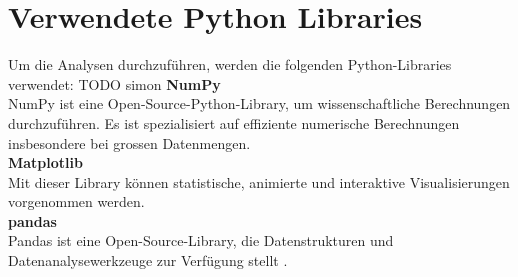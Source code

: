 \section{Verwendete Python Libraries}
Um die Analysen durchzuführen, werden die folgenden Python-Libraries verwendet:
TODO simon
\textbf{NumPy}\\
NumPy ist eine Open-Source-Python-Library, um wissenschaftliche Berechnungen durchzuführen. Es ist spezialisiert auf effiziente numerische Berechnungen insbesondere bei grossen Datenmengen. \parencite{noauthor_numpy_nodate} \\
\textbf{Matplotlib}\\
Mit dieser Library können statistische, animierte und interaktive Visualisierungen vorgenommen werden. \parencite{noauthor_matplotlib_nodate} \\
\textbf{pandas}\\
Pandas ist eine Open-Source-Library, die Datenstrukturen und Datenanalysewerkzeuge zur Verfügung stellt \parencite{noauthor_pandas_nodate}.


